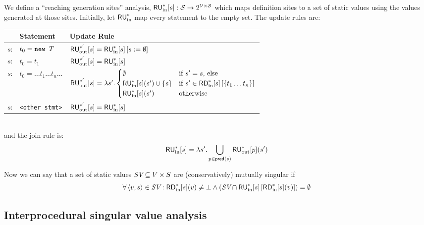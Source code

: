 \documentclass[11pt,notitlepage]{article}
\newcommand{\bigvar}[1]{\ensuremath{\text{\it #1}}}
\newcommand{\func}[1]{\ensuremath{\text{\sffamily #1}}}
\begin{document}
We define a ``reaching generation sites'' analysis,
$\func{RU}^*_\text{in}[s] : \mathcal{S}\to 2^\mathcal{V\times S}$ which
maps definition sites to a set of static values using the values
generated at those sites.  Initially, let $\func{RU}^*_\text{in}$ map
every statement to the empty set.  The update rules are:
\\
\begin{tabular}{lll}
&\textbf{Statement}&\textbf{Update Rule}\\\hline
$s$: & $t_0=\text{\tt new }T$ & $\func{RU}^{*'}_\text{out}[s]=\func{RU}^*_\text{in}[s]\left[s:=\emptyset\right]$ \\
$s$: & $t_0=t_1$ &  $\func{RU}^{*'}_\text{out}[s]=\func{RU}^*_\text{in}[s]$ \\
$s$: & $t_0=\ldots t_1 \ldots t_n \ldots$ &
 $\func{RU}^{*'}_\text{out}[s]=\lambda s' . \begin{cases}
\emptyset &\text{if }s'=s\text{, else}\\
\func{RU}^*_\text{in}[s](s')\cup\left\{s\right\}
 & \text{if }s'\in\func{RD}^*_\text{in}[s]\left[\left\{t_1\ldots
    t_n\right\}\right] \\
\func{RU}^*_\text{in}[s](s') & \text{otherwise} \\
\end{cases}$ \\
$s$: & \texttt{<other stmt>} &  $\func{RU}^{*'}_\text{out}[s]=\func{RU}^*_\text{in}[s]$ \\
\end{tabular}
\\
and the join rule is:
\begin{displaymath}
\func{RU}^*_\text{in}[s] = \lambda s'.\bigcup_{p\in\func{pred}(s)} \func{RU}^*_\text{out}[p](s')
\end{displaymath}

Now we can say that a set of static values $\bigvar{SV} \subseteq V \times S$
are (conservatively) mutually singular if
\begin{displaymath}
  \forall \tuple{v,s}\in \bigvar{SV} : \func{RD}^*_\text{in}[s](v) \neq \bot
  \wedge 
  \left(\bigvar{SV}\cap\func{RU}^*_\text{in}[s]\left[\func{RD}^*_\text{in}[s](v)\right]\right) = \emptyset
\end{displaymath}

\subsection{Interprocedural singular value analysis}
\end{document}
